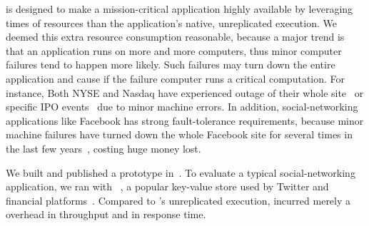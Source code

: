  \tripod is designed to make a
mission-critical application highly available by leveraging  times of 
resources than the application's native, unreplicated execution. We deemed this 
extra resource consumption reasonable, because a major trend is that an 
application runs on more and more computers, thus minor computer failures tend 
to happen more likely. Such failures may turn down the entire application and 
cause if the failure computer runs a critical computation. For instance, Both 
NYSE and Nasdaq have experienced 
outage of their whole site~\cite{nyse:halt} or specific IPO 
events~\cite{facebook:ipo:delay} due to minor machine errors. 
In addition, social-networking applications like Facebook has 
strong fault-tolerance requirements, because minor machine failures have turned 
down the whole Facebook site for several times in the last few 
years~\cite{facebook:outage}, costing huge money lost. 




 We built and published a \tripod prototype 
in~\cite{tripod:apsys16}. To evaluate a typical social-networking application, 
we ran \tripod with \memcached~\cite{memcached}, a popular key-value store used 
by Twitter and financial platforms~\cite{nosql:finance}. Compared to 
\memcached's unreplicated execution, \tripod incurred merely a \tputoverhead 
overhead in throughput and \latencyoverhead in response time.

